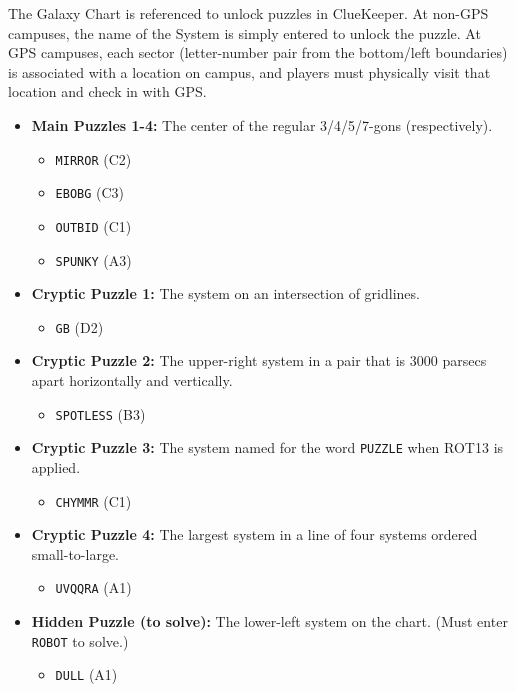 The Galaxy Chart is referenced to unlock puzzles in ClueKeeper.
At non-GPS campuses, the name of the System is simply entered to
unlock the puzzle. At GPS campuses, each sector (letter-number pair
from the bottom/left boundaries) is associated with a location on
campus, and players must physically visit that location and check
in with GPS. 

\begin{itemize}
\item
  \textbf{Main Puzzles 1-4:} The center of the regular 3/4/5/7-gons (respectively).
  \begin{itemize}
  \item \texttt{MIRROR} (C2)
  \item \texttt{EBOBG} (C3)
  \item \texttt{OUTBID} (C1)
  \item \texttt{SPUNKY} (A3)
  \end{itemize}
\item
  \textbf{Cryptic Puzzle 1:} The system on an intersection of gridlines.
\begin{itemize}\item\texttt{GB} (D2)\end{itemize}
\item
  \textbf{Cryptic Puzzle 2:} The upper-right system in a pair that is 3000 parsecs
  apart horizontally and vertically. 
\begin{itemize}\item\texttt{SPOTLESS} (B3)\end{itemize}
\item
  \textbf{Cryptic Puzzle 3:} The system named for the word \texttt{PUZZLE} when
  ROT13 is applied. 
\begin{itemize}\item\texttt{CHYMMR} (C1)\end{itemize}
\item
  \textbf{Cryptic Puzzle 4:} The largest system in a line of four systems ordered small-to-large. 
\begin{itemize}\item\texttt{UVQQRA} (A1)\end{itemize}
\item
  \textbf{Hidden Puzzle (to solve):} The lower-left system on the chart. (Must enter \texttt{ROBOT} to solve.)
\begin{itemize}\item\texttt{DULL} (A1)\end{itemize}
\end{itemize} 
